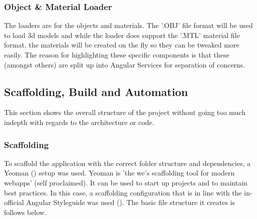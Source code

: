 \subsubsection{Object \& Material Loader}
The loaders are for the objects and materials. The '.OBJ' file format will be used to load 3d models and while the loader does support the '.MTL' material file format, the materials will be created on the fly so they can be tweaked more easily.
\newline
The reason for highlighting these specific components is that these (amongst others) are split up into Angular Services for separation of concerns.

\subsection{Scaffolding, Build and Automation}
This section shows the overall structure of the project without going too much indepth with regards to the architecture or code.
\subsubsection{Scaffolding}
To scaffold the application with the correct folder structure and dependencies, a Yeoman (\cite{yeoman}) setup was used. Yeoman is 'the we's scaffolding tool for modern webapps' (self proclaimed). It can be used to start up projects and to maintain best practices. In this case, a scaffolding configuration that is in line with the in-official Angular Styleguide was used (\cite{johnPapa}). The basic file structure it creates is follows below.

